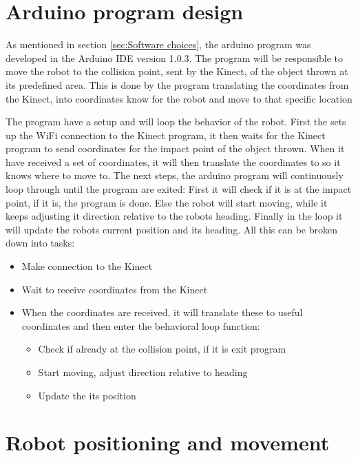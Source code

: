\section{Arduino program design}
\label{sec:Arduino program design}
As mentioned in section \ref{sec:Software choices}, the arduino program was developed in the Arduino IDE version 1.0.3. The program will be responsible to move the robot to the collision point, sent by the Kinect, of the object thrown at its predefined area. This is done by the program translating the coordinates from the Kinect, into coordinates know for the robot and move to that specific location

The program have a setup and will loop the behavior of the robot. First the sets up the WiFi connection to the Kinect program, it then waits for the Kinect program to send coordinates for the impact point of the object thrown. When it have received a set of coordinates, it will then translate the coordinates to so it knows where to move to. The next steps, the arduino program will continuously loop through until the program are exited: First it will check if it is at the impact point, if it is, the program is done. Else the robot will start moving, while it keeps adjusting it direction relative to the robots heading. Finally in the loop it will update the robots current position and its heading. All this can be broken down into tasks:

\begin{itemize}
	\item Make connection to the Kinect
	\item Wait to receive coordinates from the Kinect
	\item When the coordinates are received, it will translate these to useful coordinates and then enter the behavioral loop function:
	\begin{itemize}
		\item Check if already at the collision point, if it is exit program
		\item Start moving, adjust direction relative to heading
		\item Update the its position
	\end{itemize}
\end{itemize}
 

\section{Robot positioning and movement}
\label{sec:Robot positioning and movement}


